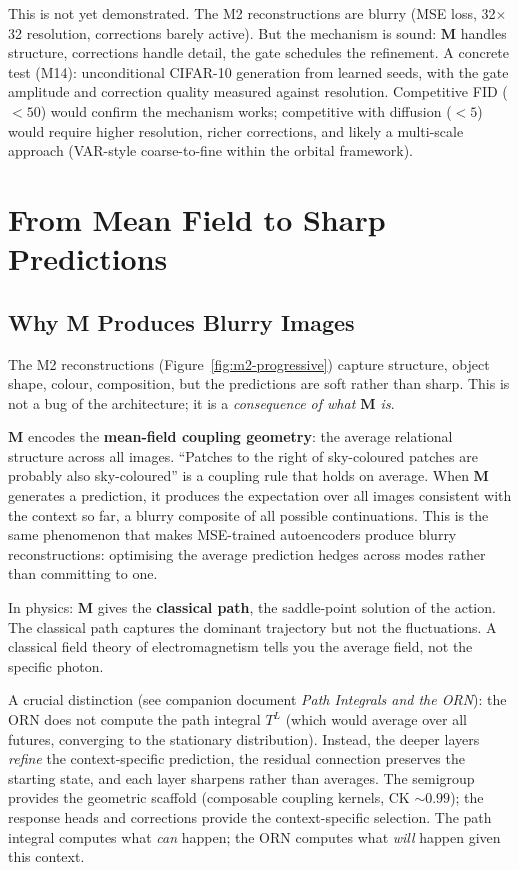 \documentclass[11pt, a4paper]{article}
\newcommand{\M}{\mathbf{M}}
\theoremstyle{plain}
\theoremstyle{remark}
\begin{document}
This is not yet demonstrated.
The M2 reconstructions are blurry (MSE loss, 32$\times$32 resolution, corrections barely active).
But the mechanism is sound: $\M$ handles structure, corrections handle detail, the gate schedules the refinement.
A concrete test (M14): unconditional CIFAR-10 generation from learned seeds, with the gate amplitude and correction quality measured against resolution.
Competitive FID ($< 50$) would confirm the mechanism works; competitive with diffusion ($< 5$) would require higher resolution, richer corrections, and likely a multi-scale approach (VAR-style coarse-to-fine within the orbital framework).

\section{From Mean Field to Sharp Predictions}

\subsection{Why M Produces Blurry Images}

The M2 reconstructions (Figure~\ref{fig:m2-progressive}) capture structure, object shape, colour, composition, but the predictions are soft rather than sharp.
This is not a bug of the architecture; it is a \emph{consequence of what $\M$ is}.

$\M$ encodes the \textbf{mean-field coupling geometry}: the average relational structure across all images.
``Patches to the right of sky-coloured patches are probably also sky-coloured'' is a coupling rule that holds on average.
When $\M$ generates a prediction, it produces the expectation over all images consistent with the context so far, a blurry composite of all possible continuations.
This is the same phenomenon that makes MSE-trained autoencoders produce blurry reconstructions: optimising the average prediction hedges across modes rather than committing to one.

In physics: $\M$ gives the \textbf{classical path}, the saddle-point solution of the action.
The classical path captures the dominant trajectory but not the fluctuations.
A classical field theory of electromagnetism tells you the average field, not the specific photon.

A crucial distinction (see companion document \textit{Path Integrals and the ORN}): the ORN does not compute the path integral $T^L$ (which would average over all futures, converging to the stationary distribution).
Instead, the deeper layers \emph{refine} the context-specific prediction, the residual connection preserves the starting state, and each layer sharpens rather than averages.
The semigroup provides the geometric scaffold (composable coupling kernels, CK ${\sim}0.99$); the response heads and corrections provide the context-specific selection.
The path integral computes what \emph{can} happen; the ORN computes what \emph{will} happen given this context.
\end{document}
